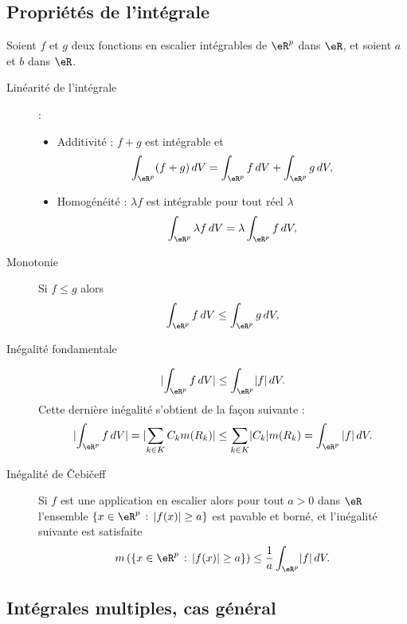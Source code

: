 \subsection{Propriétés de l'intégrale}

Soient $f$ et $g$ deux fonctions en escalier intégrables de $\eR^p$ dans $\eR$, et soient $a$ et $b$ dans $\eR$. 
\begin{description}
\item[Linéarité de l'intégrale] : 
  \begin{itemize}
  \item Additivité : $f+g$ est intégrable et 
\[
\int_{\eR^p} (f+g)\, dV = \int_{\eR^p} f\, dV+ \int_{\eR^p} g\, dV,
\]
\item Homogénéité : $\lambda f$ est intégrable pour tout réel $\lambda$ 
\[
\int_{\eR^p} \lambda  f\, dV = \lambda\int_{\eR^p} f\, dV,
\]
  \end{itemize}
\item[Monotonie] Si $f\leq g$ alors 
\[
 \int_{\eR^p} f\, dV\leq \int_{\eR^p} g\, dV,
\]
\item[Inégalité fondamentale]
  \[
\lvert \int_{\eR^p}f\,dV\rvert \leq\int_{\eR^p}\lvert f\rvert\,dV.
\] 
Cette dernière inégalité s'obtient de la façon suivante :
\[
\lvert\int_{\eR^p}f\,dV\rvert =\lvert \sum_{k\in K} C_k m(R_k)\rvert \leq\sum_{k\in K}\lvert C_k\rvert m(R_k)=\int_{\eR^p}|f|\,dV.
\] 
\item[Inégalité de Čebičeff]  Si $f$ est une application en escalier alors pour tout $a>0$ dans $\eR$ l'ensemble $\{x\in\eR^p\,:\, |f(x)|\geq a\}$ est pavable et borné, et l'inégalité suivante est satisfaite
\[
m\left(\{x\in\eR^p\,:\, |f(x)|\geq a\}\right)\leq \frac{1}{a} \int_{\eR^p}\lvert f\rvert\,dV.
\]
\end{description}

\subsection{Intégrales multiples, cas général}

